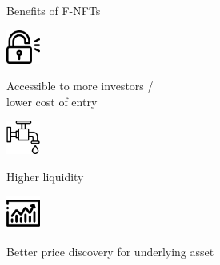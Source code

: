 \documentclass[handout]{beamer}
\begin{document}
\begin{frame}{Benefits of F-NFTs}

\begin{minipage}{0.2\textwidth}
			\begin{center}
				\includegraphics[height=3em]{../assets/images/unlocked_padlock.png}
				
			\end{center}
		\end{minipage}
		\hspace{1 em}
		\begin{minipage}{0.72\textwidth}
			Accessible to more investors / \\ lower cost of entry

		\end{minipage}
	
		\pause
		\vspace{2 em}
		\begin{minipage}{0.2\textwidth}
			\begin{center}
				\includegraphics[height=3em]{../assets/images/faucet.png}
			\end{center}
		\end{minipage}
		\hspace{1 em}
		\begin{minipage}{0.72\textwidth}
			Higher liquidity \\

		\end{minipage}
	
		\pause
		\vspace{2 em}
		\begin{minipage}{0.2\textwidth}
			\begin{center}
				\includegraphics[height=3em]{../assets/images/exchange.png}
			\end{center}
		\end{minipage}
		\hspace{1 em}
		\begin{minipage}{0.72\textwidth}
		Better price discovery for underlying asset 
		\end{minipage}


\end{frame}
\end{document}

